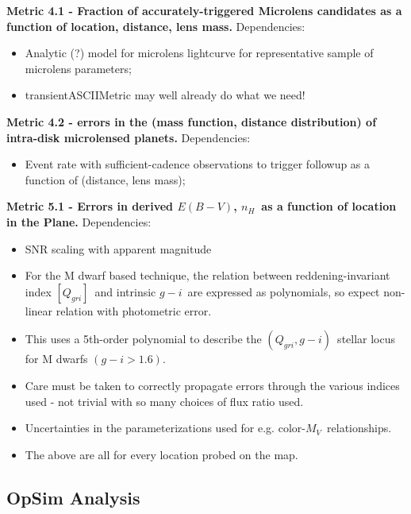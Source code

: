 {\bf Metric 4.1 - Fraction of accurately-triggered Microlens candidates as a function of location, distance, lens mass.}
Dependencies:
\begin{itemize}
  \item Analytic (?) model for microlens lightcurve for representative sample of microlens parameters;
    \item transientASCIIMetric may well already do what we need! 
\end{itemize}

{\bf Metric 4.2 - errors in the (mass function, distance distribution) of intra-disk microlensed planets.}
Dependencies:
\begin{itemize}
  \item Event rate with sufficient-cadence observations to trigger followup as a function of (distance, lens mass);
\end{itemize}

{\bf Metric 5.1 - Errors in derived $E(B-V)$, $n_H$~as a function of
  location in the Plane.}
Dependencies:
\begin{itemize}
  \item SNR scaling with apparent magnitude
    \item For the M dwarf based technique, the relation between
      reddening-invariant index $[Q_{gri}]$~and intrinsic $g-i$~are
      expressed as polynomials, so expect non-linear relation with
      photometric error.  
      \item This uses a 5th-order polynomial to describe the
        $(Q_{gri}, g-i)$~stellar locus for M dwarfs $(g-i > 1.6)$.
        \item Care must be taken to correctly propagate errors through
          the various indices used - not trivial with so many choices
          of flux ratio used.
          \item Uncertainties in the parameterizations used for e.g. color-$M_V$~relationships.
            \item The above are all for every location probed on the map.
\end{itemize}




\subsection{OpSim Analysis}
\label{sec:keyword:MW_Disk_analysis}

